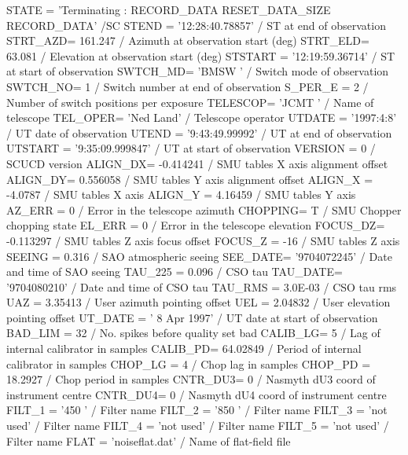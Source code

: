 \documentclass[twoside,11pt]{starlink}
\begin{document}
\begin{terminalv}
STATE   = 'Terminating         :   RECORD_DATA RESET_DATA_SIZE RECORD_DATA' /SC
STEND   = '12:28:40.78857'     / ST at end of observation
STRT_AZD=              161.247 / Azimuth at observation start (deg)
STRT_ELD=               63.081 / Elevation at observation start (deg)
STSTART = '12:19:59.36714'     / ST at start of observation
SWTCH_MD= 'BMSW    '           / Switch mode of observation
SWTCH_NO=                    1 / Switch number at end of observation
S_PER_E =                    2 / Number of switch positions per exposure
TELESCOP= 'JCMT    '           / Name of telescope
TEL_OPER= 'Ned Land'           / Telescope operator
UTDATE  = '1997:4:8'           / UT date of observation
UTEND   = '9:43:49.99992'      / UT at end of observation
UTSTART = '9:35:09.999847'     / UT at start of observation
VERSION =                    0 / SCUCD version
ALIGN_DX=            -0.414241 / SMU tables X axis alignment offset
ALIGN_DY=             0.556058 / SMU tables Y axis alignment offset
ALIGN_X =              -4.0787 / SMU tables X axis
ALIGN_Y =              4.16459 / SMU tables Y axis
AZ_ERR  =                    0 / Error in the telescope azimuth
CHOPPING=                    T / SMU Chopper chopping state
EL_ERR  =                    0 / Error in the telescope elevation
FOCUS_DZ=            -0.113297 / SMU tables Z axis focus offset
FOCUS_Z =                  -16 / SMU tables Z axis
SEEING  =                0.316 / SAO atmospheric seeing
SEE_DATE= '9704072245'         / Date and time of SAO seeing
TAU_225 =                0.096 / CSO tau
TAU_DATE= '9704080210'         / Date and time of CSO tau
TAU_RMS =              3.0E-03 / CSO tau rms
UAZ     =              3.35413 / User azimuth pointing offset
UEL     =              2.04832 / User elevation pointing offset
UT_DATE = ' 8 Apr 1997'        / UT date at start of observation
BAD_LIM =                   32 / No. spikes before quality set bad
CALIB_LG=                    5 / Lag of internal calibrator in samples
CALIB_PD=             64.02849 / Period of internal calibrator in samples
CHOP_LG =                    4 / Chop lag in samples
CHOP_PD =              18.2927 / Chop period in samples
CNTR_DU3=                    0 / Nasmyth dU3 coord of instrument centre
CNTR_DU4=                    0 / Nasmyth dU4 coord of instrument centre
FILT_1  = '450     '           / Filter name
FILT_2  = '850     '           / Filter name
FILT_3  = 'not used'           / Filter name
FILT_4  = 'not used'           / Filter name
FILT_5  = 'not used'           / Filter name
FLAT    = 'noiseflat.dat'      / Name of flat-field file

\end{terminalv}
\end{document}
